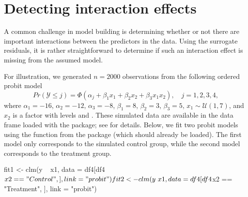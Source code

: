 \section{Detecting interaction effects}

A common challenge in model building is determining whether or not there are important interactions between the predictors in the data. Using the surrogate residuals, it is rather straightforward to determine if such an interaction effect is missing from the assumed model.

For illustration, we generated $n = 2000$ observations from the following ordered probit model
\begin{equation*}
  Pr\left(\mathcal{Y} \le j\right) = \Phi\left(\alpha_j + \beta_1 x_1 + \beta_2 x_2 + \beta_3 x_1 x_2\right), \quad j = 1, 2, 3, 4,
\end{equation*}
where $\alpha_1 = -16$, $\alpha_2 = -12$, $\alpha_3 = -8$, $\beta_1 = 8$, $\beta_2 = 3$, $\beta_3 = 5$, $x_1 \sim \mathcal{U}\left(1, 7\right)$, and $x_2$ is a factor with levels  and . These simulated data are available in the  data frame loaded with the  package; see  for details. Below, we fit two probit models using the  function from the  package (which should already be loaded). The first model only corresponds to the simulated control group, while the second model corresponds to the treatment group.
\begin{example}
fit1 <- clm(y ~ x1, data = df4[df4$x2 == "Control", ], link = "probit")
fit2 <- clm(y ~ x1, data = df4[df4$x2 == "Treatment", ], link = "probit")
\end{example}

